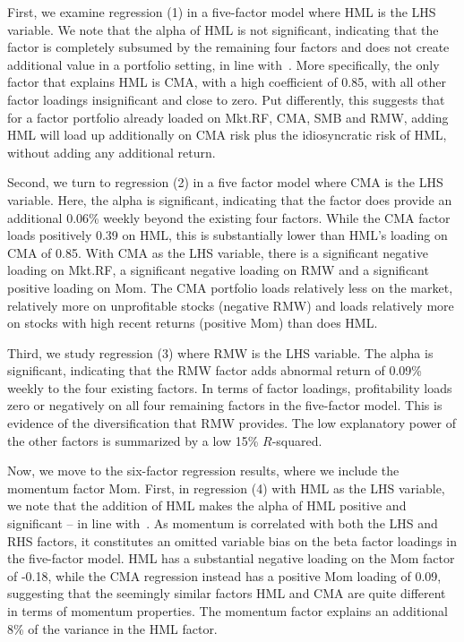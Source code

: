 First, we examine regression (1) in a five-factor model where HML is the LHS variable. We note that the alpha of HML is not significant, indicating that the factor is completely subsumed by the remaining four factors and does not create additional value in a portfolio setting, in line with~\textcite{FF2015}. More specifically, the only factor that explains HML is CMA, with a high coefficient of 0.85, with all other factor loadings insignificant and close to zero. Put differently, this suggests that for a factor portfolio already loaded on Mkt.RF, CMA, SMB and RMW, adding HML will load up additionally on CMA risk plus the idiosyncratic risk of HML, without adding any additional return.

Second, we turn to regression (2) in a five factor model where CMA is the LHS variable. Here, the alpha is significant, indicating that the factor does provide an additional 0.06\% weekly beyond the existing four factors. While the CMA factor loads positively 0.39 on HML, this is substantially lower than HML's loading on CMA of 0.85. With CMA as the LHS variable, there is a significant negative loading on Mkt.RF, a significant negative loading on RMW and a significant positive loading on Mom. The CMA portfolio loads relatively less on the market, relatively more on unprofitable stocks (negative RMW) and loads relatively more on stocks with high recent returns (positive Mom) than does HML.

Third, we study regression (3) where RMW is the LHS variable. The alpha is significant, indicating that the RMW factor adds abnormal return of 0.09\% weekly to the four existing factors. In terms of factor loadings, profitability loads zero or negatively on all four remaining factors in the five-factor model. This is evidence of the diversification that RMW provides. The low explanatory power of the other factors is summarized by a low 15\% $R$-squared.



Now, we move to the six-factor regression results, where we include the momentum factor Mom. First, in regression (4) with HML as the LHS variable, we note that the addition of HML makes the alpha of HML positive and significant -- in line with~\textcite{Asness2015}. As momentum is correlated with both the LHS and RHS factors, it constitutes an omitted variable bias on the beta factor loadings in the five-factor model. HML has a substantial negative loading on the Mom factor of -0.18, while the CMA regression instead has a positive Mom loading of 0.09, suggesting that the seemingly similar factors HML and CMA are quite different in terms of momentum properties. The momentum factor explains an additional 8\% of the variance in the HML factor. 

